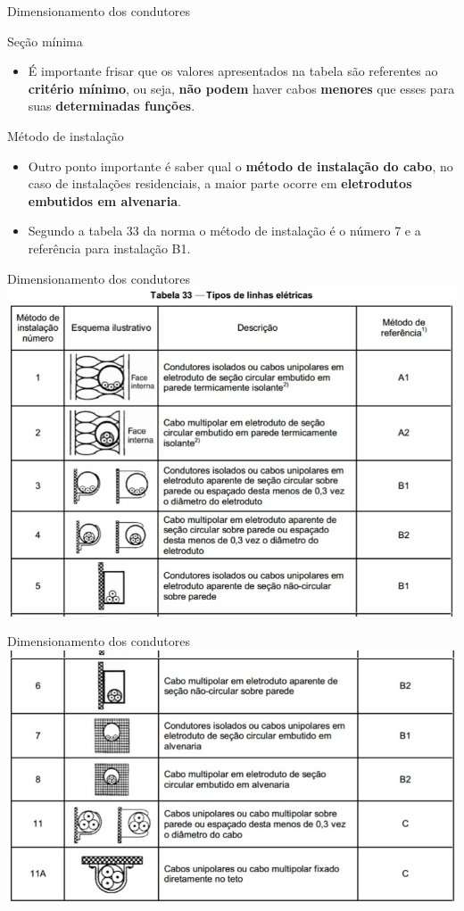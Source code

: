 \begin{frame}{Dimensionamento dos condutores}
	\begin{block}{Seção mínima}
		\begin{itemize}
			\item É importante frisar que os valores apresentados na tabela são referentes ao \textbf{critério mínimo}, ou seja, \textbf{não podem }haver cabos \textbf{menores }que esses para suas \textbf{determinadas funções}.
		\end{itemize}
	\end{block}
	\begin{block}{Método de instalação}
		\begin{itemize}
			\item Outro ponto importante é saber qual o \textbf{método de instalação do cabo}, no caso de instalações residenciais, a maior parte ocorre em \textbf{eletrodutos embutidos em alvenaria}.
			\item Segundo a tabela 33 da norma o método de instalação é o número 7 e a referência para instalação B1.
		\end{itemize}
	\end{block}
\end{frame}


\begin{frame}{Dimensionamento dos condutores}
	\centering
	\includegraphics[width=0.85\linewidth]{Figuras/Ch06/fig2.1}
\end{frame}


\begin{frame}{Dimensionamento dos condutores}
	\centering
	\includegraphics[width=0.9\linewidth]{Figuras/Ch06/fig2.2}
\end{frame}

